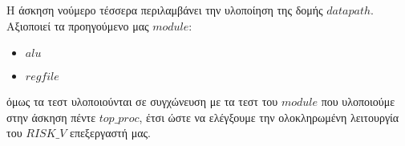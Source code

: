 Η άσκηση νούμερο τέσσερα περιλαμβάνει την υλοποίηση της δομής $datapath$.
Αξιοποιεί τα προηγούμενο μας $module$:
\begin{itemize}
    \item $alu$
    \item $regfile$
\end{itemize}
όμως τα τεστ υλοποιούνται σε συγχώνευση με τα τεστ του $module$ που υλοποιούμε 
στην άσκηση πέντε $top\_proc$, έτσι ώστε να ελέγξουμε την ολοκληρωμένη λειτουργία
του $RISK\_V$ επεξεργαστή μας.
\\
